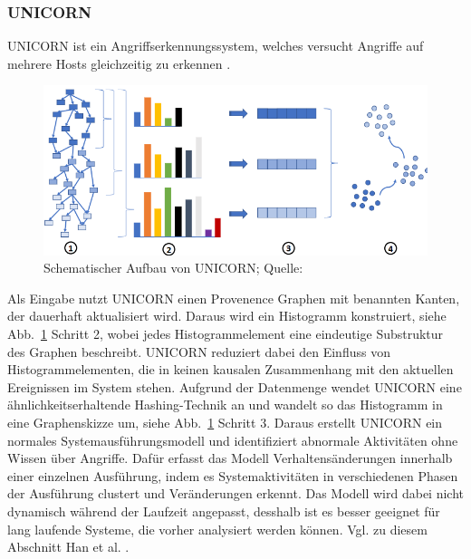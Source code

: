 \documentclass[conference]{IEEEtran}
\begin{document}
\subsubsection{UNICORN}
UNICORN ist ein Angriffserkennungssystem, welches versucht Angriffe auf mehrere Hosts gleichzeitig zu erkennen \cite{Han2020}.
\begin{figure}[htbp]
    \centerline{\includegraphics[scale=0.34]{figures/UNICORN.png}}
    \caption{Schematischer Aufbau von UNICORN; Quelle: \cite{Han2020}}
    \label{fig.unicorn}
\end{figure}
Als Eingabe nutzt UNICORN einen Provenence Graphen mit benannten Kanten, der dauerhaft aktualisiert wird.
Daraus wird ein Histogramm konstruiert, siehe Abb.~\ref{fig.unicorn} Schritt 2, wobei jedes Histogrammelement eine eindeutige Substruktur des Graphen beschreibt.
UNICORN reduziert dabei den Einfluss von Histogrammelementen, die in keinen kausalen Zusammenhang mit den aktuellen Ereignissen im System stehen.
Aufgrund der Datenmenge wendet UNICORN eine ähnlichkeitserhaltende Hashing-Technik an und wandelt so das Histogramm in eine Graphenskizze um, siehe Abb.~\ref{fig.unicorn} Schritt 3.
Daraus erstellt UNICORN ein normales Systemausführungsmodell und identifiziert abnormale Aktivitäten ohne Wissen über Angriffe.
Dafür erfasst das Modell Verhaltensänderungen innerhalb einer einzelnen Ausführung, indem es Systemaktivitäten in verschiedenen Phasen der Ausführung clustert und Veränderungen erkennt.
Das Modell wird dabei nicht dynamisch während der Laufzeit angepasst, desshalb ist es besser geeignet für lang laufende Systeme, die vorher analysiert werden können.
Vgl. zu diesem Abschnitt Han et al. \cite{Han2020}.
\end{document}
